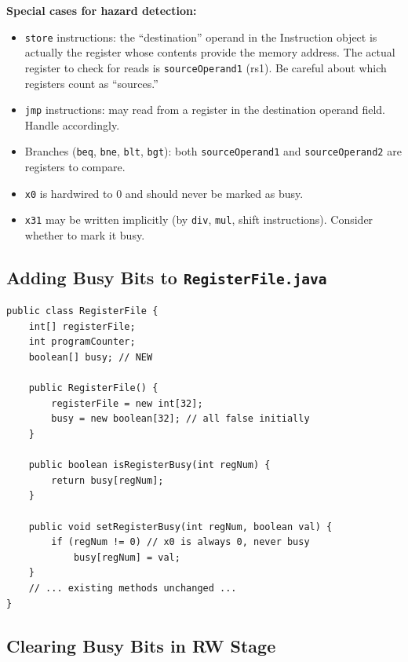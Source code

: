 \documentclass[12pt,a4paper]{article}
\begin{document}
\begin{warningbox}
\textbf{Special cases for hazard detection:}
\begin{itemize}
    \item \texttt{store} instructions: the ``destination'' operand in the Instruction object is actually the register whose contents provide the memory address. The actual register to check for reads is \texttt{sourceOperand1} (rs1). Be careful about which registers count as ``sources.''
    \item \texttt{jmp} instructions: may read from a register in the destination operand field. Handle accordingly.
    \item Branches (\texttt{beq}, \texttt{bne}, \texttt{blt}, \texttt{bgt}): both \texttt{sourceOperand1} and \texttt{sourceOperand2} are registers to compare.
    \item \texttt{x0} is hardwired to 0 and should never be marked as busy.
    \item \texttt{x31} may be written implicitly (by \texttt{div}, \texttt{mul}, shift instructions). Consider whether to mark it busy.
\end{itemize}
\end{warningbox}

\subsection{Adding Busy Bits to \texttt{RegisterFile.java}}

\begin{lstlisting}[style=javastyle, caption={Additions to \texttt{RegisterFile.java}}]
public class RegisterFile {
    int[] registerFile;
    int programCounter;
    boolean[] busy; // NEW

    public RegisterFile() {
        registerFile = new int[32];
        busy = new boolean[32]; // all false initially
    }

    public boolean isRegisterBusy(int regNum) {
        return busy[regNum];
    }

    public void setRegisterBusy(int regNum, boolean val) {
        if (regNum != 0) // x0 is always 0, never busy
            busy[regNum] = val;
    }
    // ... existing methods unchanged ...
}
\end{lstlisting}

\subsection{Clearing Busy Bits in RW Stage}
\end{document}
